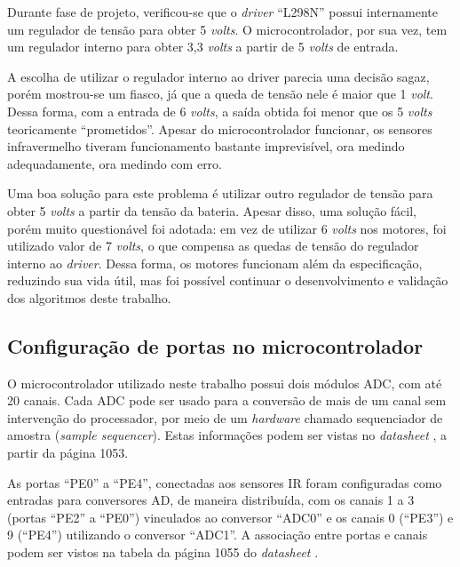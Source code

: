 	Durante fase de projeto, verificou-se que o \textit{driver} ``L298N'' possui internamente 
	um regulador de tensão para obter 5 \textit{volts}. O microcontrolador, por sua vez, tem 
	um regulador interno para obter 3,3 \textit{volts} a partir de 5 \textit{volts} de entrada. 
	
	A escolha de utilizar o regulador interno ao driver parecia uma decisão sagaz, porém
	mostrou-se um fiasco, já que a queda de tensão nele é maior que 1 \textit{volt}. Dessa 
	forma, com a entrada de 6 \textit{volts}, a saída obtida foi menor que os 5 \textit{volts} 
	teoricamente ``prometidos''. Apesar do microcontrolador funcionar, os sensores 
	infravermelho tiveram funcionamento bastante imprevisível, ora medindo adequadamente, 
	ora medindo com erro. 
	
	Uma boa solução para este problema é utilizar outro regulador de tensão para obter 
	5 \textit{volts} a partir da tensão da bateria. Apesar disso, uma solução fácil, porém 
	muito questionável foi adotada: em vez de utilizar 6 \textit{volts} nos motores, foi 
	utilizado valor de 7 \textit{volts}, o que compensa as quedas de tensão do regulador 
	interno ao \textit{driver}. Dessa forma, os motores funcionam além da especificação, 
	reduzindo sua vida útil, mas foi possível continuar o desenvolvimento e validação dos 
	algoritmos deste trabalho.
	
	\subsection{Configuração de portas no microcontrolador}
	
	O microcontrolador utilizado neste trabalho possui dois módulos
	ADC, com até 20 canais. Cada ADC pode ser usado para a conversão de mais de um canal sem
	intervenção do processador, por meio de um \textit{hardware} chamado sequenciador de 
	amostra (\textit{sample sequencer}). Estas informações podem ser vistas no 
	\textit{datasheet} \cite{datasheet:TivaC}, a partir da página 1053.
	
	As portas ``PE0'' a ``PE4'', conectadas aos sensores IR foram configuradas como entradas
	para conversores AD, de maneira distribuída, com os canais 1 a 3 (portas ``PE2'' a ``PE0'')
	vinculados ao conversor ``ADC0'' e os canais 0 (``PE3'') e 9 (``PE4'') utilizando o 
	conversor ``ADC1''. A associação entre portas e canais podem ser vistos na tabela da 
	página 1055 do \textit{datasheet} \cite{datasheet:TivaC}. 
	
